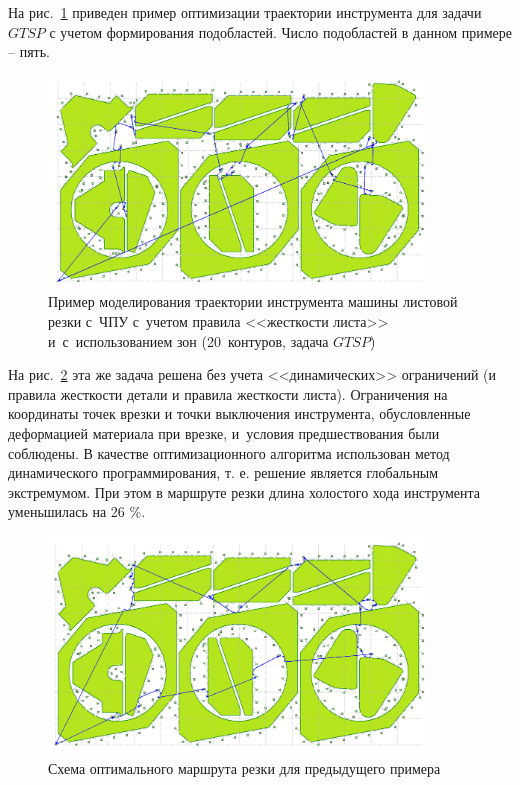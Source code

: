 \documentclass[11pt,twoside,openany]{report}
\begin{document}
На рис.~\ref{zones-a}
приведен пример оптимизации траектории
инструмента для задачи $GTSP$ с учетом
формирования подобластей.
Число подобластей в данном примере -- пять.

\begin{figure}
  \begin{center}
  \includegraphics[width=0.9\textwidth]{zones-a.png}
  \caption{
    Пример моделирования траектории инструмента машины листовой резки с~ЧПУ
    с~учетом правила <<жесткости листа>>
    и~с~использованием зон
    (20~контуров, задача $GTSP$)
    }
  \label{zones-a}
  \end{center}
\end{figure}

На рис.~\ref{zones-b}
эта же задача решена без учета
<<динамических>> ограничений
(и правила жесткости детали и правила жесткости листа).
Ограничения на координаты точек врезки и
точки выключения инструмента,
обусловленные деформацией материала при врезке,
и~условия предшествования были соблюдены.
В качестве оптимизационного алгоритма
использован метод динамического программирования,
т. е. решение является глобальным экстремумом.
При этом в маршруте резки
длина холостого хода инструмента уменьшилась на 26 \%.

\begin{figure}
  \begin{center}
  \includegraphics[width=0.9\textwidth]{zones-b.png}
  \caption{Схема оптимального маршрута резки для предыдущего примера}
  \label{zones-b}
  \end{center}
\end{figure}
\end{document}
